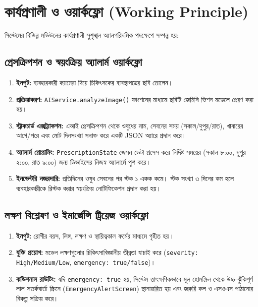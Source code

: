 \documentclass[12pt,a4paper,oneside]{report}
\begin{document}
\chapter{কার্যপ্রণালী ও ওয়ার্কফ্লো (Working Principle)}

সিস্টেমের বিভিন্ন মডিউলের কার্যপ্রণালী সুশৃঙ্খল অ্যালগরিদমিক পদক্ষেপে সম্পন্ন হয়:

\section{প্রেসক্রিপশন ও স্বয়ংক্রিয় অ্যালার্ম ওয়ার্কফ্লো}
\begin{enumerate}
    \item \textbf{ইনপুট:} ব্যবহারকারী ক্যামেরা দিয়ে চিকিৎসকের ব্যবস্থাপত্রের ছবি তোলেন।
    \item \textbf{প্রক্রিয়াকরণ:} \texttt{AIService.analyzeImage()} ফাংশনের মাধ্যমে ছবিটি জেমিনি ভিশন মডেলে প্রেরণ করা হয়।
    \item \textbf{স্ট্রাকচার্ড এক্সট্র্যাকশন:} এআই প্রেসক্রিপশন থেকে ওষুধের নাম, সেবনের সময় (সকাল/দুপুর/রাত), খাবারের আগে/পরে এবং মোট দিনসংখ্যা সনাক্ত করে একটি JSON অ্যারে প্রদান করে।
    \item \textbf{অ্যালার্ম প্রোগ্রামিং:} \texttt{PrescriptionState} জেসন ডেটা প্রসেস করে নির্দিষ্ট সময়ের (সকাল ৮:০০, দুপুর ২:০০, রাত ৯:০০) জন্য ডিভাইসের নিজস্ব অ্যালার্মে পুশ করে।
    \item \textbf{ইনভেন্টরি নজরদারি:} প্রতিদিনের ওষুধ সেবনের পর স্টক ১ একক কমে। স্টক সংখ্যা ৩ দিনের কম হলে ব্যবহারকারীকে রিস্টক করার স্বয়ংক্রিয় নোটিফিকেশন প্রদান করা হয়।
\end{enumerate}

\section{লক্ষণ বিশ্লেষণ ও ইমার্জেন্সি ট্রিয়েজ ওয়ার্কফ্লো}
\begin{enumerate}
    \item \textbf{ইনপুট:} রোগীর বয়স, লিঙ্গ, লক্ষণ ও স্থায়িত্বকাল ফর্মের মাধ্যমে গৃহীত হয়।
    \item \textbf{যুক্তি প্রয়োগ:} মডেল লক্ষণগুলোর চিকিৎসাবিজ্ঞানীয় তীব্রতা যাচাই করে (\texttt{severity: High/Medium/Low}, \texttt{emergency: true/false})।
    \item \textbf{কন্ডিশনাল রাউটিং:} যদি \texttt{emergency: true} হয়, সিস্টেম তাৎক্ষণিকভাবে মূল হোমস্ক্রিন থেকে উচ্চ-ঝুঁকিপূর্ণ লাল সতর্কবার্তা স্ক্রিনে (\texttt{EmergencyAlertScreen}) স্থানান্তরিত হয় এবং জরুরি কল ও এসওএস পাঠানোর বিকল্প সক্রিয় করে।
\end{enumerate}
\end{document}
